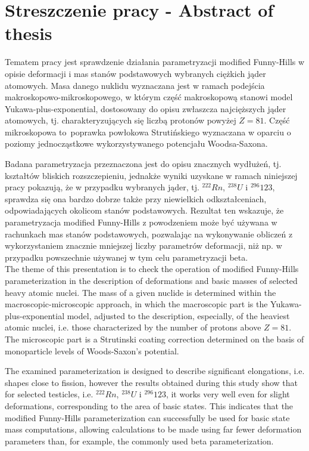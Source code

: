 \documentclass[a4paper,polish]{article}
\numberwithin{equation}{section}
\begin{document}



\section{Streszczenie pracy - Abstract of thesis}

Tematem pracy jest sprawdzenie działania parametryzacji modified Funny-Hills w opisie deformacji i mas stanów podstawowych wybranych ciężkich jąder atomowych. Masa danego nuklidu wyznaczana jest w ramach podejścia makroskopowo-mikroskopowego, w którym część makroskopową stanowi model Yukawa-plus-exponential, dostosowany do opisu zwłaszcza najcięższych jąder atomowych, tj. charakteryzujących się liczbą protonów powyżej $Z=81$. Część mikroskopowa to~poprawka powłokowa Strutińskiego wyznaczana w oparciu o poziomy jednocząstkowe wykorzystywanego potencjału Woodsa-Saxona.

Badana parametryzacja przeznaczona jest do opisu znacznych wydłużeń, tj. kształtów bliskich rozszczepieniu, jednakże wyniki uzyskane w ramach niniejszej pracy pokazują, że w przypadku wybranych jąder, tj. $^{222}Rn$, $^{238}U$ i $^{296}123$, sprawdza się ona bardzo dobrze także przy niewielkich odkształceniach, odpowiadających okolicom stanów podstawowych. Rezultat ten wskazuje, że parametryzacja modified Funny-Hills z powodzeniem może być używana w rachunkach mas stanów podstawowych, pozwalając na wykonywanie obliczeń z wykorzystaniem znacznie mniejszej liczby parametrów deformacji, niż np. w przypadku powszechnie używanej w tym celu parametryzacji beta.
\\

The theme of this presentation is to check the operation of modified Funny-Hills parameterization in the description of deformations and basic masses of selected heavy atomic nuclei. The mass of a given nuclide is determined within the macroscopic-microscopic approach, in which the macroscopic part is the Yukawa-plus-exponential model, adjusted to the description, especially, of the heaviest atomic nuclei, i.e. those characterized by the number of protons above $Z=81$. The microscopic part is a Strutinski coating correction determined on the basis of monoparticle levels of Woods-Saxon's potential.

The examined parameterization is designed to describe significant elongations, i.e. shapes close to fission, however the results obtained during this study show that for selected testicles, i.e. $^{222}Rn$, $^{238}U$ i $^{296}123$, it works very well even for slight deformations, corresponding to the area of basic states. This indicates that the modified Funny-Hills parameterization can successfully be used for basic state mass computations, allowing calculations to be made using far fewer deformation parameters than, for example, the commonly used beta parameterization.
\end{document}
